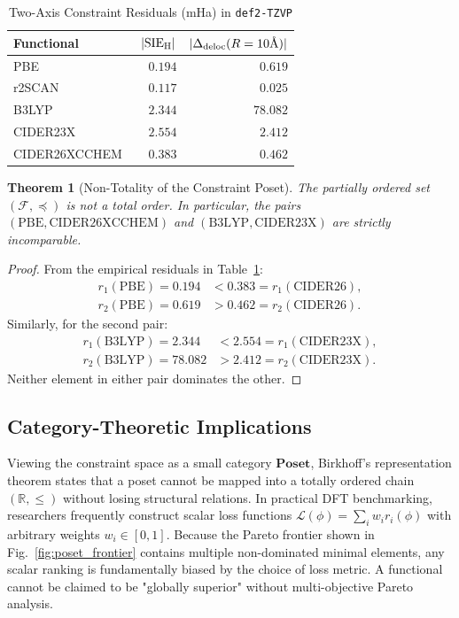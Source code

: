 \documentclass[journal]{IEEEtran}
\newtheorem{theorem}{Theorem}
\begin{document}
\begin{table}[htbp]
\centering
\caption{Two-Axis Constraint Residuals (mHa) in \texttt{def2-TZVP}}
\label{tab:poset_table}
\begin{tabular}{lrr}
\toprule
Functional & $|\text{SIE}_{\rm H}|$ & $|\Delta_{\rm deloc}(R=10\text{\AA})|$ \\
\midrule
PBE~\cite{PBE1996}              & $0.194$ & $0.619$ \\
r2SCAN~\cite{r2SCAN2020}        & $0.117$ & $0.025$ \\
B3LYP~\cite{B3LYP1994}          & $2.344$ & $78.082$ \\
CIDER23X~\cite{CIDER2024}       & $2.554$ & $2.412$ \\
CIDER26XCCHEM~\cite{CIDER2026}  & $0.383$ & $0.462$ \\
\bottomrule
\end{tabular}
\end{table}

\begin{theorem}[Non-Totality of the Constraint Poset]
\label{thm:poset_nontotal}
The partially ordered set $(\mathcal{F}, \preceq)$ is not a total order. In particular, the pairs $(\text{PBE}, \text{CIDER26XCCHEM})$ and $(\text{B3LYP}, \text{CIDER23X})$ are strictly incomparable.
\end{theorem}
\begin{proof}
From the empirical residuals in Table~\ref{tab:poset_table}:
\begin{align}
r_1(\text{PBE}) = 0.194 &< 0.383 = r_1(\text{CIDER26}), \\
r_2(\text{PBE}) = 0.619 &> 0.462 = r_2(\text{CIDER26}).
\end{align}
Similarly, for the second pair:
\begin{align}
r_1(\text{B3LYP}) = 2.344 &< 2.554 = r_1(\text{CIDER23X}), \\
r_2(\text{B3LYP}) = 78.082 &> 2.412 = r_2(\text{CIDER23X}).
\end{align}
Neither element in either pair dominates the other.
\end{proof}

\subsection{Category-Theoretic Implications}
Viewing the constraint space as a small category $\mathbf{Poset}$, Birkhoff's representation theorem states that a poset cannot be mapped into a totally ordered chain $(\mathbb{R}, \le)$ without losing structural relations. In practical DFT benchmarking, researchers frequently construct scalar loss functions $\mathcal{L}(\phi) = \sum_i w_i r_i(\phi)$ with arbitrary weights $w_i \in [0, 1]$. Because the Pareto frontier shown in Fig.~\ref{fig:poset_frontier} contains multiple non-dominated minimal elements, any scalar ranking is fundamentally biased by the choice of loss metric. A functional cannot be claimed to be "globally superior" without multi-objective Pareto analysis.
\end{document}
